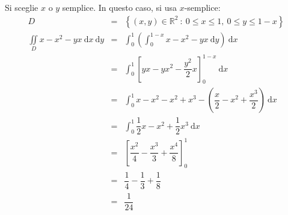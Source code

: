 \documentclass[a4paper]{article}
\begin{document}
	Si sceglie $x$ o $y$ semplice. In questo caso, si usa $x$-semplice:
	\begin{equation*}
		\begin{array}{rcl}
			D &=& \left\{\left(x,y\right) \in \mathbb{R}^{2} \: : \: 0 \le x \le 1, \: 0 \le y \le 1-x\right\} \\ [1em]
			\displaystyle\iint\limits_{D} x - x^{2} - yx \:\mathrm{d}x\:\mathrm{d}y
			&=&
			\displaystyle\int_{0}^{1} \left(\int_{0}^{1-x} x-x^{2}-yx \:\mathrm{d}y\right) \:\mathrm{d}x \\ [1.5em]
			&=&
			\displaystyle\int_{0}^{1} \left[ yx-yx^{2}-\dfrac{y^{2}}{2}x \right]_{0}^{1-x} \:\mathrm{d}x \\ [1.5em]
			&=&
			\displaystyle\int_{0}^{1} x-x^{2} - x^{2} + x^{3} - \left(\dfrac{x}{2} - x^{2} + \dfrac{x^{3}}{2}\right) \:\mathrm{d}x \\ [1.5em]
			&=&
			\displaystyle\int_{0}^{1} \dfrac{1}{2}x - x^{2} + \dfrac{1}{2}x^{3} \:\mathrm{d}x \\ [1.5em]
			&=&
			\left[ \dfrac{x^{2}}{4} - \dfrac{x^{3}}{3} + \dfrac{x^{4}}{8} \right]_{0}^{1} \\ [1.5em]
			&=&
			\dfrac{1}{4} - \dfrac{1}{3} + \dfrac{1}{8} \\ [1em]
			&=& \dfrac{1}{24}
		\end{array}
	\end{equation*}\newpage
\end{document}
